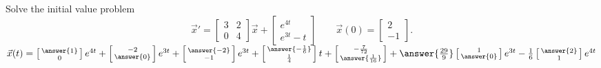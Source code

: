 \documentclass{ximera}
\begin{document}
\begin{exercise}
    Solve the initial value problem
    \[ 
        {\vec{x}}' = 
        \begin{bmatrix} 
            3 & 2 \\ 
            0 & 4 
        \end{bmatrix}\vec{x} 
        + 
        \begin{bmatrix} 
            e^{4t} \\ 
            e^{3t} - t 
        \end{bmatrix} 
        \qquad \vec{x}(0) = 
        \begin{bmatrix} 
            2 \\ 
            -1 
        \end{bmatrix}. 
    \]
    $\vec{x}(t) = \left[\begin{smallmatrix} \answer{1} \\ 0 \end{smallmatrix}\right]e^{4t} + \left[\begin{smallmatrix} -2 \\ \answer{0} \end{smallmatrix}\right]e^{3t} + \left[\begin{smallmatrix} \answer{-2} \\ -1 \end{smallmatrix}\right]e^{3t} + \left[\begin{smallmatrix} \answer{-\frac{1}{6}} \\ \frac{1}{4} \end{smallmatrix}\right]t + \left[\begin{smallmatrix} -\frac{7}{72}\\ \answer{\frac{1}{16}} \end{smallmatrix}\right] + \answer{\frac{29}{9}}\left[\begin{smallmatrix}  1 \\ \answer{0} \end{smallmatrix}\right]e^{3t} - \frac{1}{6}\left[\begin{smallmatrix} \answer{2} \\ 1 \end{smallmatrix}\right]e^{4t}$
\end{exercise}
\end{document}
